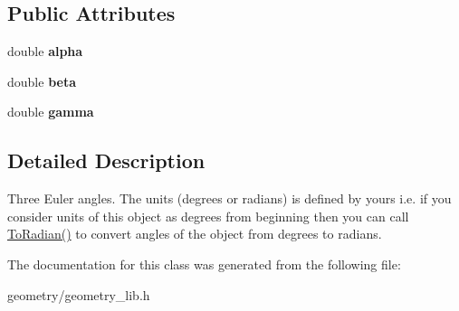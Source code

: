 \subsection*{Public Attributes}
\begin{DoxyCompactItemize}
\item 
\mbox{\label{class_angle_ad75fbb9a44298ccf044813020e566022}} 
double {\bfseries alpha}
\item 
\mbox{\label{class_angle_a04433ed74d977eb0785e23a0518e8456}} 
double {\bfseries beta}
\item 
\mbox{\label{class_angle_a01740ca43b0032dad4d50c3c40de2606}} 
double {\bfseries gamma}
\end{DoxyCompactItemize}


\subsection{Detailed Description}
Three Euler angles. The units (degrees or radians) is defined by yours i.\+e. if you consider units of this object as degrees from beginning then you can call \mbox{\hyperlink{class_angle_a72dd5f472528fe9edaaafaf91d71670e}{To\+Radian()}} to convert angles of the object from degrees to radians. 

The documentation for this class was generated from the following file\+:\begin{DoxyCompactItemize}
\item 
geometry/geometry\+\_\+lib.\+h\end{DoxyCompactItemize}
